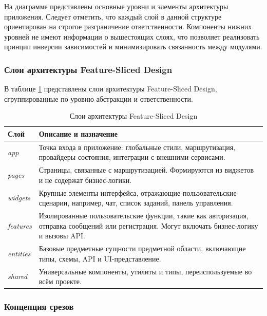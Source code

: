 На диаграмме представлены основные уровни и элементы архитектуры приложения. Следует отметить, что каждый слой в данной структуре ориентирован на строгое разграничение ответственности. Компоненты нижних уровней не имеют информации о вышестоящих слоях, что позволяет реализовать принцип инверсии зависимостей и минимизировать связанность между модулями.

\subsubsection{Слои архитектуры Feature-Sliced Design}

В таблице \ref{tab:fsd-layers} представлены слои архитектуры Feature-Sliced Design, сгруппированные по уровню абстракции и ответственности.

\begin{table}[h]
  \centering
  \caption{Слои архитектуры Feature-Sliced Design}
  \label{tab:fsd-layers}
  \begin{tabular}{|p{3cm}|p{11cm}|}
    \hline
    \textbf{Слой} & \textbf{Описание и назначение} \\ \hline
    \textit{app}      & Точка входа в приложение: глобальные стили, маршрутизация, провайдеры состояния, интеграции с внешними сервисами. \\ \hline
    \textit{pages}    & Страницы, связанные с маршрутизацией. Формируются из виджетов и не содержат бизнес-логики. \\ \hline
    \textit{widgets}  & Крупные элементы интерфейса, отражающие пользовательские сценарии, например, чат, список заданий, панель управления. \\ \hline
    \textit{features}& Изолированные пользовательские функции, такие как авторизация, отправка сообщений или регистрация. Могут включать бизнес-логику и вызовы API. \\ \hline
    \textit{entities} & Базовые предметные сущности предметной области, включающие типы, схемы, API и UI-представление. \\ \hline
    \textit{shared}   & Универсальные компоненты, утилиты и типы, переиспользуемые во всём проекте. \\ \hline
  \end{tabular}
\end{table}

\subsubsection{Концепция срезов}

